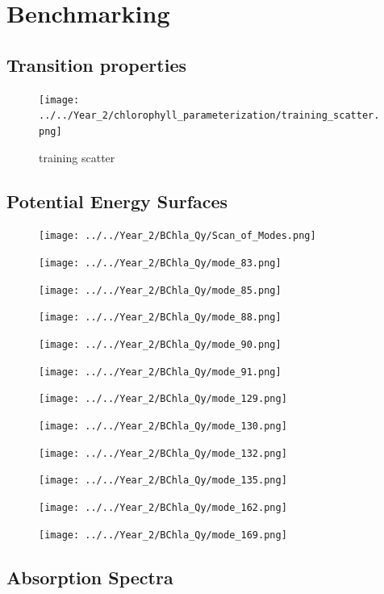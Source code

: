 \section{Benchmarking}
\label{sec:chl_benchmarking}

\subsection{Transition properties}
\label{subsec:transition_properties}

\begin{figure}
    \texttt{[image: ../../Year\_2/chlorophyll\_parameterization/training\_scatter.png]}
    \caption{training scatter}
\end{figure}

\subsection{Potential Energy Surfaces}
\label{subsec:pot_energy_surfaces}

\begin{figure}
    \texttt{[image: ../../Year\_2/BChla\_Qy/Scan\_of\_Modes.png]}
\end{figure}

\begin{figure}
    \texttt{[image: ../../Year\_2/BChla\_Qy/mode\_83.png]}
\end{figure}
\begin{figure}
    \texttt{[image: ../../Year\_2/BChla\_Qy/mode\_85.png]}
\end{figure}
\begin{figure}
    \texttt{[image: ../../Year\_2/BChla\_Qy/mode\_88.png]}
\end{figure}
\begin{figure}
    \texttt{[image: ../../Year\_2/BChla\_Qy/mode\_90.png]}
\end{figure}
\begin{figure}
    \texttt{[image: ../../Year\_2/BChla\_Qy/mode\_91.png]}
\end{figure}
\begin{figure}
    \texttt{[image: ../../Year\_2/BChla\_Qy/mode\_129.png]}
\end{figure}
\begin{figure}
    \texttt{[image: ../../Year\_2/BChla\_Qy/mode\_130.png]}
\end{figure}
\begin{figure}
    \texttt{[image: ../../Year\_2/BChla\_Qy/mode\_132.png]}
\end{figure}
\begin{figure}
    \texttt{[image: ../../Year\_2/BChla\_Qy/mode\_135.png]}
\end{figure}
\begin{figure}
    \texttt{[image: ../../Year\_2/BChla\_Qy/mode\_162.png]}
\end{figure}
\begin{figure}
    \texttt{[image: ../../Year\_2/BChla\_Qy/mode\_169.png]}
\end{figure}

\subsection{Absorption Spectra}
\label{subsec:absorption_spectra}


